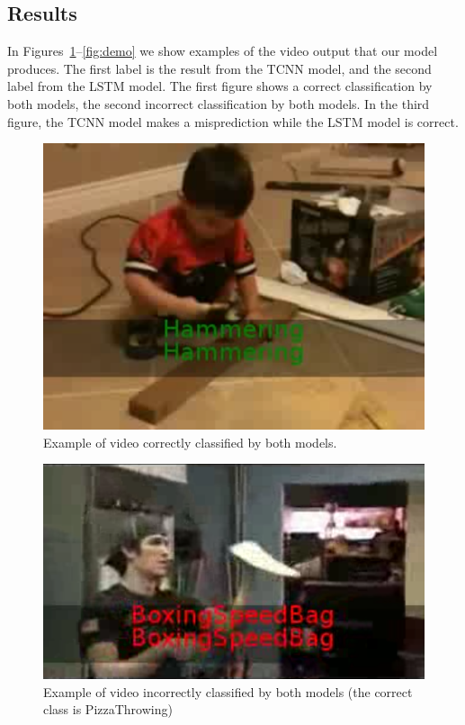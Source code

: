 
\subsection{Results}
In Figures~\ref{fig:democorrect}--\ref{fig:demo} we show examples of the video output that our model produces. The first label is the result from the TCNN model, and the second label from the LSTM model. The first figure shows a correct classification by both models, the second incorrect classification by both models. In the third figure, the TCNN model makes a misprediction while the LSTM model is correct.  
\begin{figure}
  \centering
  \includegraphics[width=0.8\linewidth]{figs/democorrect}
  \caption{Example of video correctly classified by both models.}
  \label{fig:democorrect}
\end{figure}


\begin{figure}
  \centering
  \includegraphics[width=0.8\linewidth]{figs/demoincorrect}
  \caption{Example of video incorrectly classified by both models (the correct class is PizzaThrowing)}
  \label{fig:demoincorrect}
\end{figure}

